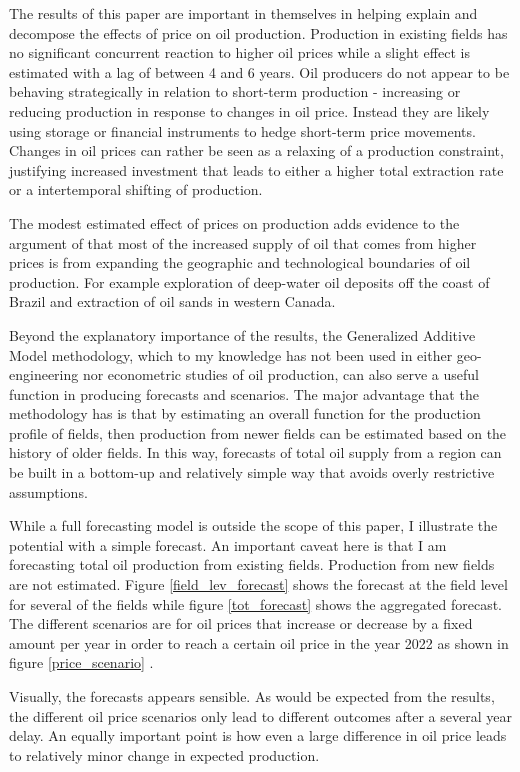 \documentclass[12pt]{scrartcl} %
\begin{document}
The results of this paper are important in themselves in helping explain and decompose the effects of price on oil production.  Production in existing fields has no significant concurrent reaction to higher oil prices while a slight effect is estimated  with a lag of between 4 and 6 years.  Oil producers do not appear to be behaving strategically in relation to short-term production - increasing or reducing production in response to changes in oil price.  Instead they are likely using storage or financial instruments to hedge short-term price movements. Changes in oil prices can rather be seen as a relaxing of a production constraint, justifying increased investment that leads to either a higher total extraction rate or a intertemporal shifting of production. 

The modest estimated effect of prices on production adds evidence to the argument of \citet{hamilton_oil_2012} that most of the increased supply of oil that comes from higher prices is from expanding the geographic and technological boundaries of oil production.  For example exploration of deep-water oil deposits off the coast of Brazil and extraction of oil sands in western Canada.  

Beyond the explanatory importance of the results, the Generalized Additive Model methodology, which to my knowledge has not been used in either geo-engineering nor econometric studies of oil production, can also serve a useful function in producing forecasts and scenarios.  The major advantage that the methodology has is that by estimating an overall function for the production profile of fields, then production from newer fields can be estimated based on the history of older fields.  In this way, forecasts of total oil supply from a region can be built in a bottom-up and relatively simple way that avoids overly restrictive assumptions. 

While a full forecasting model is outside the scope of this paper, I illustrate the potential with a simple forecast.  An important caveat here is that I am forecasting total oil production from existing fields.  Production from new fields are not estimated.  Figure \ref{field_lev_forecast} shows the forecast at the field level for several of the fields while figure \ref{tot_forecast} shows the aggregated forecast.  The different scenarios are for oil prices that increase or decrease by a fixed amount per year in order to reach a certain oil price in the year 2022 as shown in figure \ref{price_scenario} .  

Visually, the forecasts appears sensible.  As would be expected from the results, the different oil price scenarios only lead to different outcomes after a several year delay.  An equally important point is how even a large difference in oil price leads to relatively minor change in expected production.  
\end{document}
